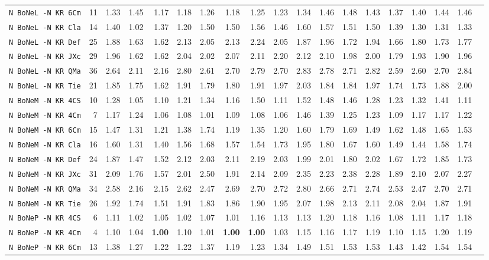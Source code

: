 \begin{tabular}{l | r @{~~} r | r@{~~}r@{~~}r@{~~}r@{~~}r@{~~}r@{~~}r@{~~}r@{~~}r@{~~}r@{~~}r@{~~}r@{~~}r@{~~}r@{~~}r@{~~}r|}
\verb+N BoNeL -N KR 6Cm+ & 11 & 1.33 & 1.45&1.17&1.18&1.26&1.18&1.25&1.23&1.34&1.46&1.48&1.43&1.37&1.40&1.44&1.46\\
\verb+N BoNeL -N KR Cla+ & 14 & 1.40 & 1.02&1.37&1.20&1.50&1.50&1.56&1.46&1.60&1.57&1.51&1.50&1.39&1.30&1.31&1.33\\
\verb+N BoNeL -N KR Def+ & 25 & 1.88 & 1.63&1.62&2.13&2.05&2.13&2.24&2.05&1.87&1.96&1.72&1.94&1.66&1.80&1.73&1.77\\
\verb+N BoNeL -N KR JXc+ & 29 & 1.96 & 1.62&1.62&2.04&2.02&2.07&2.11&2.20&2.12&2.10&1.98&2.00&1.79&1.93&1.90&1.96\\
\verb+N BoNeL -N KR QMa+ & 36 & 2.64 & 2.11&2.16&2.80&2.61&2.70&2.79&2.70&2.83&2.78&2.71&2.82&2.59&2.60&2.70&2.84\\
\verb+N BoNeL -N KR Tie+ & 21 & 1.85 & 1.75&1.62&1.91&1.79&1.80&1.91&1.97&2.03&1.84&1.84&1.97&1.74&1.73&1.88&2.00\\
\verb+N BoNeM -N KR 4CS+ & 10 & 1.28 & 1.05&1.10&1.21&1.34&1.16&1.50&1.11&1.52&1.48&1.46&1.28&1.23&1.32&1.41&1.11\\
\verb+N BoNeM -N KR 4Cm+ & 7 & 1.17 & 1.24&1.06&1.08&1.01&1.09&1.08&1.06&1.46&1.39&1.25&1.23&1.09&1.17&1.17&1.22\\
\verb+N BoNeM -N KR 6Cm+ & 15 & 1.47 & 1.31&1.21&1.38&1.74&1.19&1.35&1.20&1.60&1.79&1.69&1.49&1.62&1.48&1.65&1.53\\
\verb+N BoNeM -N KR Cla+ & 16 & 1.60 & 1.31&1.40&1.56&1.68&1.57&1.54&1.73&1.95&1.80&1.67&1.60&1.49&1.44&1.58&1.74\\
\verb+N BoNeM -N KR Def+ & 24 & 1.87 & 1.47&1.52&2.12&2.03&2.11&2.19&2.03&1.99&2.01&1.80&2.02&1.67&1.72&1.85&1.73\\
\verb+N BoNeM -N KR JXc+ & 31 & 2.09 & 1.76&1.57&2.01&2.50&1.91&2.14&2.09&2.35&2.23&2.38&2.28&1.89&2.10&2.07&2.27\\
\verb+N BoNeM -N KR QMa+ & 34 & 2.58 & 2.16&2.15&2.62&2.47&2.69&2.70&2.72&2.80&2.66&2.71&2.74&2.53&2.47&2.70&2.71\\
\verb+N BoNeM -N KR Tie+ & 26 & 1.92 & 1.74&1.51&1.91&1.83&1.86&1.90&1.95&2.07&1.98&2.13&2.11&2.08&2.04&1.87&1.91\\
\verb+N BoNeP -N KR 4CS+ & 6 & 1.11 & 1.02&1.05&1.02&1.07&1.01&1.16&1.13&1.13&1.20&1.18&1.16&1.08&1.11&1.17&1.18\\
\verb+N BoNeP -N KR 4Cm+ & 4 & 1.10 & 1.04&\textbf{1.00}&1.10&1.01&\textbf{1.00}&\textbf{1.00}&1.03&1.15&1.16&1.17&1.19&1.10&1.15&1.20&1.19\\
\verb+N BoNeP -N KR 6Cm+ & 13 & 1.38 & 1.27&1.22&1.22&1.37&1.19&1.23&1.34&1.49&1.51&1.53&1.53&1.43&1.42&1.54&1.54\\

\end{tabular}
